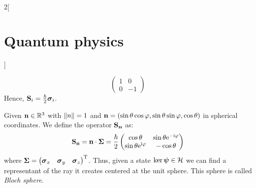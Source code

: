 \documentclass[../../../main_physics.tex]{subfiles}
\begin{document}
\begin{multicols}{2}[\section{Quantum physics}]
\begin{definition}
$$      \begin{pmatrix}
        1 & 0  \\
        0 & -1
      \end{pmatrix}$$
    Hence, $\boldsymbol{\mathrm{S}}_i=\frac{\hbar}{2}\boldsymbol{\mathrm{\sigma}}_i$.
  \end{definition}
  \begin{definition}
    Given $\boldsymbol{\mathrm{n}}\in\mathbb{R}^3$ with $\left\|n\right\|=1$ and $\boldsymbol{\mathrm{n}}=(\sin\theta\cos\varphi,\sin\theta\sin\varphi,\cos\theta)$ in spherical coordinates. We define the operator $\boldsymbol{\mathrm{S}}_{\boldsymbol{\mathrm{n}}}$ as:
    $$\boldsymbol{\mathrm{S}}_{\boldsymbol{\mathrm{n}}}=\boldsymbol{\mathrm{n}}\cdot\boldsymbol{\mathrm{\Sigma}}=\frac{\hbar}{2}\begin{pmatrix}
        \cos\theta                 & \sin\theta\mathrm{e}^{-\mathrm{i}\varphi} \\
        \sin\theta\mathrm{e}^{\mathrm{i}\varphi} & -\cos\theta
      \end{pmatrix}$$
    where $\boldsymbol{\mathrm{\Sigma}}={\begin{pmatrix}
          \boldsymbol{\mathrm{\sigma}}_x & \boldsymbol{\mathrm{\sigma}}_y & \boldsymbol{\mathrm{\sigma}}_z
        \end{pmatrix}}^{\mathrm{T}}$.
    Thus, given a state $\ker{\boldsymbol{\mathrm{\psi}}}\in\mathcal{H}$ we can find a representant of the ray it creates centered at the unit sphere. This sphere is called \emph{Bloch sphere}.
  \end{definition}
\end{multicols}
\end{document}
